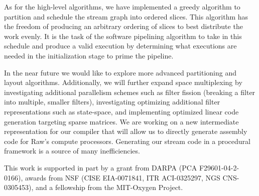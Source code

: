 \documentclass{csailabstractbook}
\begin{document}
As for the high-level algorithms, we have implemented a greedy
algorithm to partition and schedule the stream graph into ordered slices.
This algorithm has the freedom of producing an arbitrary ordering of slices
to best distribute the work evenly. It is the task of the software
pipelining algorithm to take in this schedule and produce a valid
execution by determining what executions are needed in the initialization
stage to prime the pipeline.

In the near future we would like to explore more advanced partitioning
and layout algorithms.  Additionally, we will further expand
space multiplexing by investigating additional parallelism schemes
such as filter fission (breaking a filter into multiple, smaller
filters), investigating optimizing additional filter representations
such as state-space, and implementing optimized linear code generation 
targeting sparse matrices.  We are working on a new intermediate representation
for our compiler that will allow us to directly generate assembly code for
Raw's compute processors. Generating our stream code in a procedural
framework is a source of many inefficiencies.  

This work is supported in part by a grant from DARPA (PCA
F29601-04-2-0166), awards from NSF (CISE EIA-0071841, ITR ACI-0325297,
NGS CNS-0305453), and a fellowship from the MIT-Oxygen Project.


\end{document}
